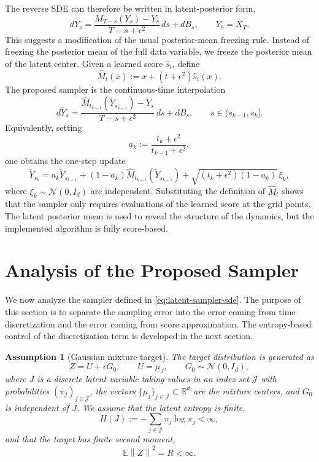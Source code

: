 \documentclass[11pt]{article}
\newtheorem{assumption}{Assumption}
\newcommand{\R}{\mathbb{R}}
\newcommand{\E}{\mathbb{E}}
\newcommand{\eps}{\epsilon}
\newcommand{\norm}[1]{\left\lVert #1 \right\rVert}
\begin{document}
The reverse SDE can therefore be written in latent-posterior form,
\[
    dY_s
    =
    \frac{M_{T-s}(Y_s)-Y_s}{T-s+\eps^2}\,ds+dB_s,
    \qquad
    Y_0=X_T .
\]
This suggests a modification of the usual posterior-mean freezing rule. Instead of freezing the posterior mean of the full data variable, we freeze the posterior mean of the latent center. Given a learned score $\widehat s_t$, define
\[
    \widehat M_t(x)
    :=
    x+(t+\eps^2)\widehat s_t(x).
\]
The proposed sampler is the continuous-time interpolation
\begin{equation}
\label{eq:latent-sampler-sde}
    d\widetilde Y_s
    =
    \frac{
    \widehat M_{t_{k-1}}(\widetilde Y_{s_{k-1}})
    -
    \widetilde Y_s
    }{T-s+\eps^2}\,ds+dB_s,
    \qquad
    s\in(s_{k-1},s_k].
\end{equation}
Equivalently, setting
\[
    a_k:=\frac{t_k+\eps^2}{t_{k-1}+\eps^2},
\]
one obtains the one-step update
\[
    \widetilde Y_{s_k}
    =
    a_k\widetilde Y_{s_{k-1}}
    +
    (1-a_k)\widehat M_{t_{k-1}}(\widetilde Y_{s_{k-1}})
    +
    \sqrt{(t_k+\eps^2)(1-a_k)}\,\xi_k,
\]
where $\xi_k\sim\mathcal N(0,I_d)$ are independent. Substituting the definition of $\widehat M_t$ shows that the sampler only requires evaluations of the learned score at the grid points. The latent posterior mean is used to reveal the structure of the dynamics, but the implemented algorithm is fully score-based.

\section{Analysis of the Proposed Sampler}

We now analyze the sampler defined in \eqref{eq:latent-sampler-sde}. The purpose of this section is to separate the sampling error into the error coming from time discretization and the error coming from score approximation. The entropy-based control of the discretization term is developed in the next section.

\begin{assumption}[Gaussian mixture target]
\label{ass:gmm-target}
The target distribution is generated as
\[
    Z=U+\eps G_0,
    \qquad
    U=\mu_J,
    \qquad
    G_0\sim\mathcal N(0,I_d),
\]
where $J$ is a discrete latent variable taking values in an index set $\mathcal J$ with probabilities $(\pi_j)_{j\in\mathcal J}$, the vectors $\{\mu_j\}_{j\in\mathcal J}\subset\R^d$ are the mixture centers, and $G_0$ is independent of $J$. We assume that the latent entropy is finite,
\[
    H(J):=-\sum_{j\in\mathcal J}\pi_j\log\pi_j<\infty,
\]
and that the target has finite second moment,
\[
    \E\norm{Z}^2 = R < \infty .
\]
\end{assumption}
\end{document}
